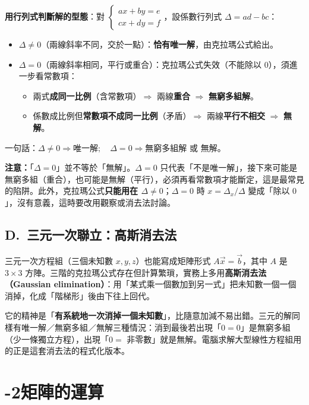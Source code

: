 \documentclass[11pt]{article}
\begin{document}
\textbf{用行列式判斷解的型態}：對 $\begin{cases} ax+by=e\\ cx+dy=f \end{cases}$，設係數行列式 $\Delta=ad-bc$：

\begin{itemize}\setlength{\itemsep}{2pt}
\item $\Delta\ne0$（兩線斜率不同，交於一點）：\textbf{恰有唯一解}，由克拉瑪公式給出。
\item $\Delta=0$（兩線斜率相同，平行或重合）：克拉瑪公式失效（不能除以 $0$），須進一步看常數項：
\begin{itemize}\setlength{\itemsep}{1pt}
\item 兩式\textbf{成同一比例}（含常數項）$\Rightarrow$ 兩線\textbf{重合} $\Rightarrow$ \textbf{無窮多組解}。
\item 係數成比例但\textbf{常數項不成同一比例}（矛盾）$\Rightarrow$ 兩線\textbf{平行不相交} $\Rightarrow$ \textbf{無解}。
\end{itemize}
\end{itemize}
一句話：$\boxed{\Delta\ne0\Rightarrow\text{唯一解};\quad \Delta=0\Rightarrow\text{無窮多組解 或 無解}}$。

\textbf{注意：}「$\Delta=0$」並不等於「無解」。$\Delta=0$ 只代表「不是唯一解」，接下來可能是無窮多組（重合），也可能是無解（平行），必須再看常數項才能斷定，這是最常見的陷阱。此外，克拉瑪公式\textbf{只能用在 $\Delta\ne0$}；$\Delta=0$ 時 $x=\Delta_x/\Delta$ 變成「除以 $0$」，沒有意義，這時要改用觀察或消去法討論。

\subsection*{\sffamily D.\ 三元一次聯立：高斯消去法}

三元一次方程組（三個未知數 $x,y,z$）也能寫成矩陣形式 $A\vec x=\vec b$，其中 $A$ 是 $3\times3$ 方陣。三階的克拉瑪公式存在但計算繁瑣，實務上多用\textbf{高斯消去法（Gaussian elimination）}：用「某式乘一個數加到另一式」把未知數一個一個消掉，化成「階梯形」後由下往上回代。

它的精神是「\textbf{有系統地一次消掉一個未知數}」，比隨意加減不易出錯。三元的解同樣有唯一解／無窮多組／無解三種情況：消到最後若出現「$0=0$」是無窮多組（少一條獨立方程），出現「$0=$ 非零數」就是無解。電腦求解大型線性方程組用的正是這套消去法的程式化版本。

\section*{-2\quad 矩陣的運算}
\end{document}
